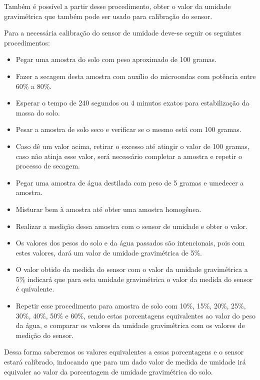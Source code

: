   Também é possível a partir desse procedimento, obter o valor da umidade gravimétrica que também pode ser usado para calibração do sensor.
  
  Para a necessária calibração do sensor de umidade deve-se seguir os seguintes procedimentos:
  
  \begin{itemize}
  	\item Pegar uma amostra do solo com peso aproximado de 100 gramas.
  	\item Fazer a secagem desta amostra com auxílio do microondas com potência entre 60\% a 80\%.
  	\item Esperar o tempo de 240 segundos ou 4 minutos exatos para estabilização da massa do solo.
  	\item Pesar a amostra de solo seco e verificar se o mesmo está com 100 gramas.
  	\item Caso dê um valor acima, retirar o excesso até atingir o valor de 100 gramas, caso não atinja esse valor, será necessário completar a amostra e repetir o processo de secagem.
  	\item Pegar uma amostra de água destilada com peso de 5 gramas e umedecer a amostra.
  	\item Misturar bem à amostra até obter uma amostra homogênea.
  	\item Realizar a medição dessa amostra com o sensor de umidade e obter o valor.
  	\item Os valores dos pesos do solo e da água passados são intencionais, pois com estes valores, dará um valor de umidade gravimétrica de 5\%.
  	\item O valor obtido da medida do sensor com o valor da umidade gravimétrica a 5\% indicará que para esta umidade gravimétrica o valor da medida do sensor é quivalente.
  	\item Repetir esse procedimento para amostra de solo com 10\%, 15\%, 20\%, 25\%, 30\%, 40\%, 50\% e 60\%, sendo estas porcentagens equivalentes ao valor do peso da água, e comparar os valores da umidade gravimétrica com os valores de medição do sensor.
  \end{itemize}
  
  Dessa forma saberemos os valores equivalentes a essas porcentagens e o sensor estará calibrado, indocando que para um dado valor de medida de umidade irá equivaler ao valor da porcentagem de umidade gravimétrica do solo.

